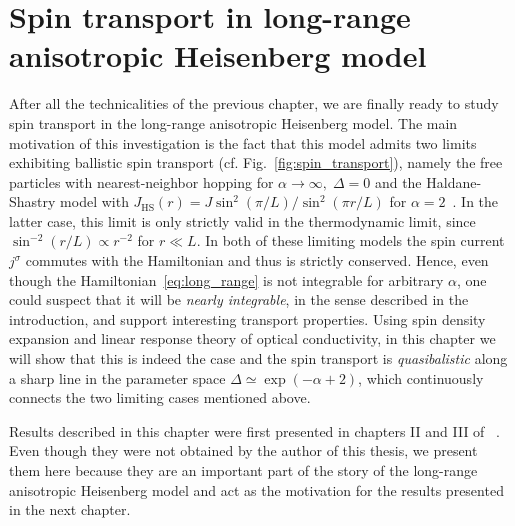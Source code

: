 \chapter{Spin transport in long-range anisotropic Heisenberg model\label{chap:spin_transport}}
\thispagestyle{chapterBeginStyle}

After all the technicalities of the previous chapter, we are finally ready to study spin transport in
the long-range anisotropic Heisenberg model. The main motivation of this investigation is the fact that this model admits
two limits exhibiting ballistic spin transport (cf. Fig.~\ref{fig:spin_transport}), namely the free particles
with nearest-neighbor hopping for \(\alpha\to \infty,\; \Delta = 0\) and the Haldane-Shastry
model with \(J_{\mathrm{HS}}(r) = J \sin^2\left(\pi/L\right)/\sin^2\left(\pi r/L\right)\)
for \(\alpha = 2\)~\autocite{Haldane1988,Shastry1988}. In the latter case, this limit is only strictly valid
in the thermodynamic limit, since \(\sin^{-2}\left(r/L\right)\propto r^{-2}\) for \(r \ll L\).
In both of these limiting models the spin current
\(j^{\sigma}\) commutes with the Hamiltonian and thus is strictly conserved. Hence, even though
the Hamiltonian~\eqref{eq:long_range} is not integrable for arbitrary \(\alpha\), one could suspect
that it will be \textit{nearly integrable}, in the sense described in the introduction, and support
interesting transport properties. Using spin density expansion and linear response theory
of optical conductivity, in this chapter we will show that this is indeed the case and the spin transport is \textit{quasibalistic} along a sharp
line in the parameter space \(\Delta \simeq \exp(- \alpha + 2)\), which continuously connects the two limiting
cases mentioned above.

Results described in this chapter were first presented in chapters II and III of ~\textcite{Mierzejewski2023}.
Even though they were not obtained by the author of this thesis, we present them here because they are an
important part of the story of the long-range anisotropic Heisenberg model and act as the motivation 
for the results presented in the next chapter.


